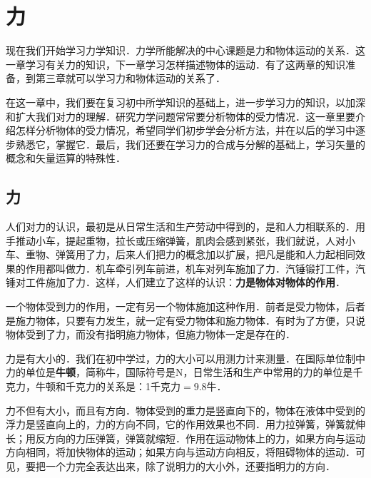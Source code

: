 \chapter{力}

现在我们开始学习力学知识．力学所能解决的中心课题是力和物体运动的关系．这一章学习有关力的知识，下一章学习怎样描述物体的运动．有了这两章的知识准备，到第三章就可以学习力和物体运动的关系了．

在这一章中，我们要在复习初中所学知识的基础上，进一步学习力的知识，以加深和扩大我们对力的理解．研究力学问题常常要分析物体的受力情况．这一章里要介绍怎样分析物体的受力情况，希望同学们初步学会分析方法，并在以后的学习中逐步熟悉它，掌握它．最后，我们还要在学习力的合成与分解的基础上，学习矢量的概念和矢量运算的特殊性．

\section{力}

人们对力的认识，最初是从日常生活和生产劳动中得到的，是和人力相联系的．用手推动小车，提起重物，拉长或压缩弹簧，肌肉会感到紧张，我们就说，人对小车、重物、弹簧用了力，后来人们把力的概念加以扩展，把凡是能和人力起相同效果的作用都叫做力．机车牵引列车前进，机车对列车施加了力．汽锤锻打工件，汽锤对工件施加了力．这样，人们建立了这样的认识：\textbf{力是物体对物体的作用}．

一个物体受到力的作用，一定有另一个物体施加这种作用．前者是受力物体，后者是施力物体，只要有力发生，就一定有受力物体和施力物体．有时为了方便，只说物体受到了力，而没有指明施力物体，但施力物体一定是存在的．

力是有大小的．我们在初中学过，力的大小可以用测力计来测量．在国际单位制中力的单位是\textbf{牛顿}，简称牛，国际符号是N，日常生活和生产中常用的力的单位是千克力，牛顿和千克力的关系是：1千克力$=9.8$牛．

力不但有大小，而且有方向．物体受到的重力是竖直向下的，物体在液体中受到的浮力是竖直向上的，力的方向不同，它的作用效果也不同．用力拉弹簧，弹簧就伸长；用反方向的力压弹簧，弹簧就缩短．作用在运动物体上的力，如果方向与运动方向相同，将加快物体的运动；如果方向与运动方向相反，将阻碍物体的运动．可见，要把一个力完全表达出来，除了说明力的大小外，还要指明力的方向．

